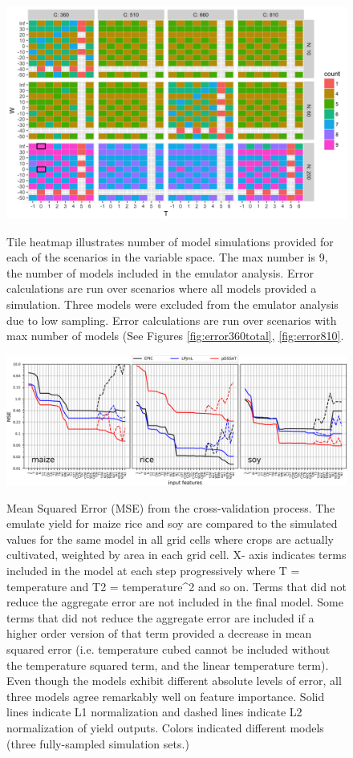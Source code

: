 \documentclass[10pt]{article}
\begin{document}
{\begin{figure}[h!]
\includegraphics[width=\textwidth]{s_how_many_simulations.png}\\
\caption{Tile heatmap illustrates number of model simulations provided for each of the scenarios in the variable space. The max number is 9, the number of models included in the emulator analysis. Error calculations are run over scenarios where all models provided a simulation. Three models were excluded from the emulator analysis due to low sampling. Error calculations are run over scenarios with max number of models (See Figures \ref{fig:error360total}, \ref{fig:error810}.}
\label{fig:numbersims}
\end{figure}

\begin{figure}[h!]
\includegraphics[width=\textwidth]{s_feature_selection.png}\\
\caption{Mean Squared Error (MSE) from the cross-validation process. The emulate yield for maize rice and soy are compared to the simulated values for the same model in all grid cells where crops are actually cultivated, weighted by area in each grid cell. X- axis indicates terms included in the model at each step progressively where T = temperature and T2 = temperature^{2} and so on. Terms that did not reduce the aggregate error are not included in the final model. Some terms that did not reduce the aggregate error are included if a higher order version of that term provided a decrease in mean squared error (i.e. temperature cubed cannot be included without the temperature squared term, and the linear temperature term). Even though the models exhibit different absolute levels of error, all three models agree remarkably well on feature importance. Solid lines indicate L1 normalization and dashed lines indicate L2 normalization of yield outputs. Colors indicated different models (three fully-sampled simulation sets.)}
\label{fig:featureselection}
\end{figure}

}
\end{document}
